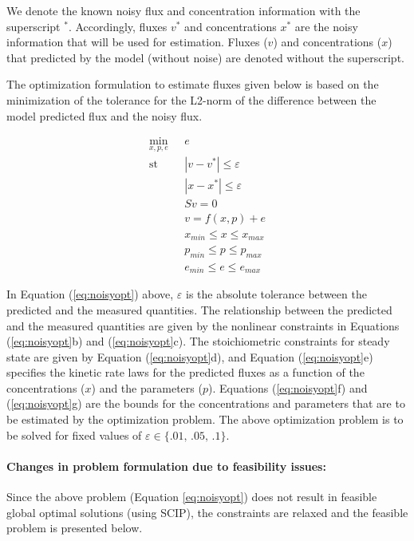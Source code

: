\documentclass[10pt]{report}
\begin{document}
	We denote the known noisy flux and concentration information with the superscript $^*$. Accordingly, fluxes $v^*$ and concentrations $x^*$ are the noisy information that will be used for estimation. Fluxes ($v$) and concentrations ($x$) that predicted by the model (without noise) are denoted without the superscript.
	
	The optimization formulation to estimate fluxes given below is based on the minimization of the tolerance for the L2-norm of the difference between the model predicted flux and the noisy flux. 
	\begin{center}
		\begin{subequations}\label{eq:noisyopt}
			\begin{align}
			\underset{x,p,e}{\mathrm{min}} & \text{      }e\\
			\mathrm{st} & \text{      }|v-v^*| \le \varepsilon\\
			& \text{      }|x-x^*| \le \varepsilon\\
			& \text{      }Sv = 0\\
			& \text{      }v = f(x,p) + e\\
			& \text{      }x_{min}\le x \le x_{max}\\
			& \text{      }p_{min} \le p \le p_{max}\\	
			& \text{      }e_{min} \le e \le e_{max}						
			\end{align}
		\end{subequations}		
	\end{center}

	In Equation (\ref{eq:noisyopt}) above, $\varepsilon$ is the absolute tolerance between the predicted and the measured quantities. The relationship between the predicted and the measured quantities are given by the nonlinear constraints in Equations (\ref{eq:noisyopt}b) and (\ref{eq:noisyopt}c). The stoichiometric constraints for steady state are given by Equation (\ref{eq:noisyopt}d), and Equation (\ref{eq:noisyopt}e) specifies the kinetic rate laws for the predicted fluxes as a function of the concentrations ($x$) and the parameters ($p$). Equations (\ref{eq:noisyopt}f) and (\ref{eq:noisyopt}g) are the bounds for the concentrations and parameters that are to be estimated by the optimization problem. The above optimization problem is to be solved for fixed values of $\varepsilon \in \{\text{.01, .05, .1}\}$.	
	
	\paragraph{Changes in problem formulation due to feasibility issues:}
	Since the above problem (Equation \ref{eq:noisyopt}) does not result in feasible global optimal solutions (using SCIP), the constraints are relaxed and the feasible problem is presented below.
	
\end{document}
